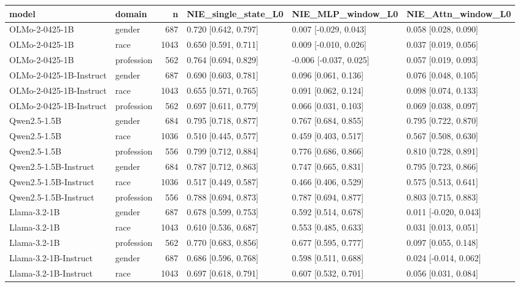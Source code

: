 \begin{tabular}{llrlll}
\toprule
model & domain & n & NIE_single_state_L0 & NIE_MLP_window_L0 & NIE_Attn_window_L0 \\
\midrule
OLMo-2-0425-1B & gender & 687 & 0.720 [0.642, 0.797] & 0.007 [-0.029, 0.043] & 0.058 [0.028, 0.090] \\
OLMo-2-0425-1B & race & 1043 & 0.650 [0.591, 0.711] & 0.009 [-0.010, 0.026] & 0.037 [0.019, 0.056] \\
OLMo-2-0425-1B & profession & 562 & 0.764 [0.694, 0.829] & -0.006 [-0.037, 0.025] & 0.057 [0.019, 0.093] \\
OLMo-2-0425-1B-Instruct & gender & 687 & 0.690 [0.603, 0.781] & 0.096 [0.061, 0.136] & 0.076 [0.048, 0.105] \\
OLMo-2-0425-1B-Instruct & race & 1043 & 0.655 [0.571, 0.765] & 0.091 [0.062, 0.124] & 0.098 [0.074, 0.133] \\
OLMo-2-0425-1B-Instruct & profession & 562 & 0.697 [0.611, 0.779] & 0.066 [0.031, 0.103] & 0.069 [0.038, 0.097] \\
Qwen2.5-1.5B & gender & 684 & 0.795 [0.718, 0.877] & 0.767 [0.684, 0.855] & 0.795 [0.722, 0.870] \\
Qwen2.5-1.5B & race & 1036 & 0.510 [0.445, 0.577] & 0.459 [0.403, 0.517] & 0.567 [0.508, 0.630] \\
Qwen2.5-1.5B & profession & 556 & 0.799 [0.712, 0.884] & 0.776 [0.686, 0.866] & 0.810 [0.728, 0.891] \\
Qwen2.5-1.5B-Instruct & gender & 684 & 0.787 [0.712, 0.863] & 0.747 [0.665, 0.831] & 0.795 [0.723, 0.866] \\
Qwen2.5-1.5B-Instruct & race & 1036 & 0.517 [0.449, 0.587] & 0.466 [0.406, 0.529] & 0.575 [0.513, 0.641] \\
Qwen2.5-1.5B-Instruct & profession & 556 & 0.788 [0.694, 0.873] & 0.787 [0.694, 0.877] & 0.803 [0.715, 0.883] \\
Llama-3.2-1B & gender & 687 & 0.678 [0.599, 0.753] & 0.592 [0.514, 0.678] & 0.011 [-0.020, 0.043] \\
Llama-3.2-1B & race & 1043 & 0.610 [0.536, 0.687] & 0.553 [0.485, 0.633] & 0.031 [0.013, 0.051] \\
Llama-3.2-1B & profession & 562 & 0.770 [0.683, 0.856] & 0.677 [0.595, 0.777] & 0.097 [0.055, 0.148] \\
Llama-3.2-1B-Instruct & gender & 687 & 0.686 [0.596, 0.768] & 0.598 [0.511, 0.688] & 0.024 [-0.014, 0.062] \\
Llama-3.2-1B-Instruct & race & 1043 & 0.697 [0.618, 0.791] & 0.607 [0.532, 0.701] & 0.056 [0.031, 0.084] \\

\end{tabular}
